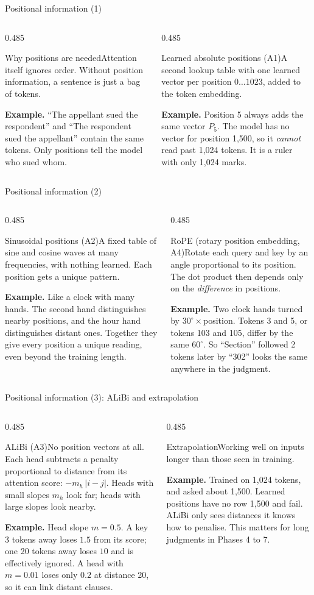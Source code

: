 \documentclass[aspectratio=169,11pt]{beamer}
\newcommand{\term}[3]{%
  \begin{block}{#1}\small #2\par\vspace{1mm}%
  {\color{exgreen}\textbf{Example.}} #3\end{block}}
\newcommand{\twoterms}[6]{%
  \begin{columns}[T]
    \begin{column}{0.485\textwidth}\term{#1}{#2}{#3}\end{column}
    \begin{column}{0.485\textwidth}\term{#4}{#5}{#6}\end{column}
  \end{columns}}
\begin{document}
\begin{frame}{Positional information (1)}
  \twoterms{Why positions are needed}
  {Attention itself ignores order. Without position information, a sentence is just a bag of tokens.}
  {``The appellant sued the respondent'' and ``The respondent sued the appellant'' contain the same tokens. Only positions tell the model who sued whom.}
  {Learned absolute positions (A1)}
  {A second lookup table with one learned vector per position $0\ldots1023$, added to the token embedding.}
  {Position 5 always adds the same vector $P_5$. The model has no vector for position 1,500, so it \emph{cannot} read past 1,024 tokens. It is a ruler with only 1,024 marks.}
\end{frame}

\begin{frame}{Positional information (2)}
  \twoterms{Sinusoidal positions (A2)}
  {A fixed table of sine and cosine waves at many frequencies, with nothing learned. Each position gets a unique pattern.}
  {Like a clock with many hands. The second hand distinguishes nearby positions, and the hour hand distinguishes distant ones. Together they give every position a unique reading, even beyond the training length.}
  {RoPE (rotary position embedding, A4)}
  {Rotate each query and key by an angle proportional to its position. The dot product then depends only on the \emph{difference} in positions.}
  {Two clock hands turned by $30^\circ\times$position. Tokens 3 and 5, or tokens 103 and 105, differ by the same $60^\circ$. So ``Section'' followed 2 tokens later by ``302'' looks the same anywhere in the judgment.}
\end{frame}

\begin{frame}{Positional information (3): ALiBi and extrapolation}
  \twoterms{ALiBi (A3)}
  {No position vectors at all. Each head subtracts a penalty proportional to distance from its attention score: $-m_h\,|i-j|$. Heads with small slopes $m_h$ look far; heads with large slopes look nearby.}
  {Head slope $m=0.5$. A key 3 tokens away loses $1.5$ from its score; one 20 tokens away loses $10$ and is effectively ignored. A head with $m=0.01$ loses only $0.2$ at distance 20, so it can link distant clauses.}
  {Extrapolation}
  {Working well on inputs longer than those seen in training.}
  {Trained on 1,024 tokens, and asked about 1,500. Learned positions have no row 1,500 and fail. ALiBi only sees distances it knows how to penalise. This matters for long judgments in Phases 4 to 7.}
\end{frame}
\end{document}
